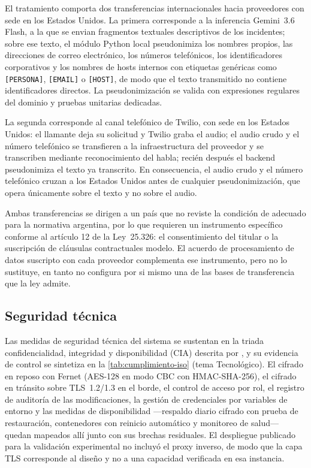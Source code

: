 El tratamiento comporta dos transferencias internacionales hacia proveedores con sede en los Estados Unidos. La primera corresponde a la inferencia Gemini~3.6 Flash, a la que se envian fragmentos textuales descriptivos de los incidentes; sobre ese texto, el módulo Python local pseudonimiza los nombres propios, las direcciones de correo electrónico, los números telefónicos, los identificadores corporativos y los nombres de hosts internos con etiquetas genéricas como \texttt{[PERSONA]}, \texttt{[EMAIL]} o \texttt{[HOST]}, de modo que el texto transmitido no contiene identificadores directos. La pseudonimización se valida con expresiones regulares del dominio y pruebas unitarias dedicadas.

La segunda corresponde al canal telefónico de Twilio, con sede en los Estados Unidos: el llamante deja su solicitud y Twilio graba el audio; el audio crudo y el número telefónico se transfieren a la infraestructura del proveedor y se transcriben mediante reconocimiento del habla; recién después el backend pseudonimiza el texto ya transcrito. En consecuencia, el audio crudo y el número telefónico cruzan a los Estados Unidos antes de cualquier pseudonimización, que opera únicamente sobre el texto y no sobre el audio.

Ambas transferencias se dirigen a un país que no reviste la condición de adecuado para la normativa argentina, por lo que requieren un instrumento específico conforme al artículo 12 de la Ley~25.326: el consentimiento del titular o la suscripción de cláusulas contractuales modelo. El acuerdo de procesamiento de datos suscripto con cada proveedor complementa ese instrumento, pero no lo sustituye, en tanto no configura por si mismo una de las bases de transferencia que la ley admite.

\subsection{Seguridad técnica}\label{subsec:seguridad-tecnica}

Las medidas de seguridad técnica del sistema se sustentan en la triada confidencialidad, integridad y disponibilidad (CIA) descrita por \textcite{Stallings2017_computer_security}, y su evidencia de control se sintetiza en la \autoref{tab:cumplimiento-iso} (tema Tecnológico). El cifrado en reposo con Fernet (AES-128 en modo CBC con HMAC-SHA-256), el cifrado en tránsito sobre TLS~1.2/1.3 en el borde, el control de acceso por rol, el registro de auditoría de las modificaciones, la gestión de credenciales por variables de entorno y las medidas de disponibilidad ---respaldo diario cifrado con prueba de restauración, contenedores con reinicio automático y monitoreo de salud--- quedan mapeados allí junto con sus brechas residuales. El despliegue publicado para la validación experimental no incluyó el proxy inverso, de modo que la capa TLS corresponde al diseño y no a una capacidad verificada en esa instancia.

